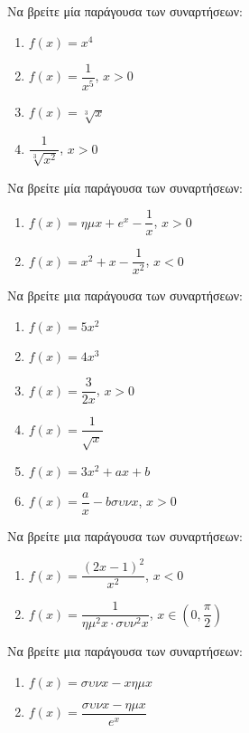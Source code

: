 \documentclass{../presentation}
\begin{document}
\begin{askisi}
  Να βρείτε μία παράγουσα των συναρτήσεων:
  \begin{enumerate}[<+->]
    \item $f(x)=x^4$
    \item $f(x)=\dfrac{1}{x^5}$, $x>0$
    \item $f(x)=\sqrt[3]{x}$
    \item $\dfrac{1}{\sqrt[3]{x^2}}$, $x>0$
  \end{enumerate}
\end{askisi}

\begin{askisi}
  Να βρείτε μία παράγουσα των συναρτήσεων:
  \begin{enumerate}[<+->]
    \item $f(x)=ημx+e^x-\dfrac{1}{x}$, $x>0$
    \item $f(x)=x^2+x-\dfrac{1}{x^2}$, $x<0$
  \end{enumerate}
\end{askisi}

\begin{askisi}
  Να βρείτε μια παράγουσα των συναρτήσεων:
  \begin{enumerate}[<+->]
    \item $f(x)=5x^2$
    \item $f(x)=4x^3$
    \item $f(x)=\dfrac{3}{2x}$, $x>0$
    \item $f(x)=\dfrac{1}{\sqrt{x}}$
    \item $f(x)=3x^2+ax+b$
    \item $f(x)=\dfrac{a}{x}-bσυνx$, $x>0$
  \end{enumerate}
\end{askisi}

\begin{askisi}
  Να βρείτε μια παράγουσα των συναρτήσεων:
  \begin{enumerate}[<+->]
    \item $f(x)=\dfrac{(2x-1)^2}{x^2}$, $x<0$
    \item $f(x)=\dfrac{1}{ημ^2x\cdot συν^2x}$, $x\in \left( 0,\dfrac{π}{2} \right) $
  \end{enumerate}
\end{askisi}

\begin{askisi}
  Να βρείτε μια παράγουσα των συναρτήσεων:
  \begin{enumerate}[<+->]
    \item $f(x)=συνx-xημx$
    \item $f(x)=\dfrac{συνx-ημx}{e^x}$
  \end{enumerate}
\end{askisi}
\end{document}
